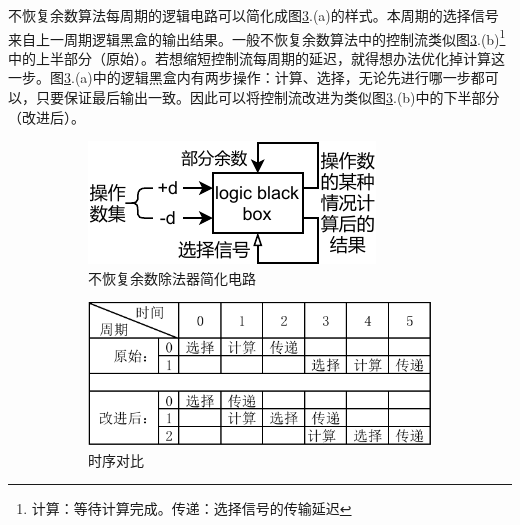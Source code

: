 \documentclass[UTF8,12pt,punct=kaiming,fontset=none]{article}
\begin{document}
    不恢复余数算法每周期的逻辑电路可以简化成图\ref{fig5}.(a)的样式。本周期的选择信号来自上一周期逻辑黑盒的输出结果。一般不恢复余数算法中的控制流类似图\ref{fig5}.(b)\footnote{计算：等待计算完成。传递：选择信号的传输延迟}中的上半部分（原始）。若想缩短控制流每周期的延迟，就得想办法优化掉计算这一步。图\ref{fig5}.(a)中的逻辑黑盒内有两步操作：计算、选择，无论先进行哪一步都可以，只要保证最后输出一致。因此可以将控制流改进为类似图\ref{fig5}.(b)中的下半部分（改进后）。

    \begin{figure}[H]
        \centering
        \begin{subfigure}{6cm}
            \includegraphics[width=\linewidth]{divb.pdf}
            \caption{不恢复余数除法器简化电路}
            \label{fig5:a} %
        \end{subfigure}
        \hspace{0.5in}%
        \begin{subfigure}{8cm}
            \includegraphics[width=\linewidth]{divt.pdf}
            \caption{时序对比}
            \label{fig5:subfig:b} %
        \end{subfigure}
        \caption{}
        \label{fig5} %
    \end{figure}
\end{document}
